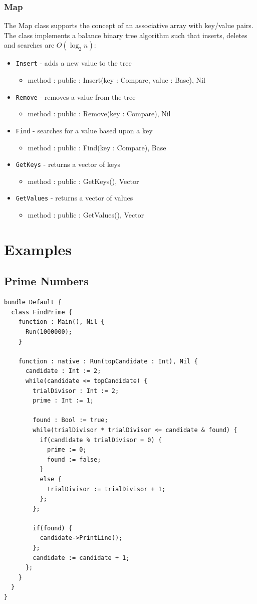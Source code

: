 \documentclass[12pt]{article}
\begin{document}
\subsubsection{Map}
The Map class supports the concept of an associative array with key/value pairs.  The class implements a balance binary tree algorithm such that inserts, deletes and searches are $O(\log_2 n)$:
\begin{itemize}
    \item \texttt{Insert} - adds a new value to the tree
    	\begin{itemize}
	\item method : public : Insert(key : Compare, value : Base), Nil
	\end{itemize}
    \item \texttt{Remove} - removes a value from the tree
    	\begin{itemize}
	\item method : public : Remove(key : Compare), Nil
	\end{itemize}
    \item \texttt{Find} - searches for a value based upon a key
    	\begin{itemize}
	\item method : public : Find(key : Compare), Base
	\end{itemize}
    \item \texttt{GetKeys} - returns a vector of keys
    	\begin{itemize}
	\item method : public : GetKeys(), Vector
	\end{itemize}
    \item \texttt{GetValues} - returns a vector of values
    	\begin{itemize}
	\item method : public : GetValues(), Vector
	\end{itemize}
\end{itemize}

\section{Examples}
\subsection{Prime Numbers}
\begin{verbatim}
bundle Default {
  class FindPrime {
    function : Main(), Nil {
      Run(1000000);
    }

    function : native : Run(topCandidate : Int), Nil {
      candidate : Int := 2;
      while(candidate <= topCandidate) {
        trialDivisor : Int := 2;
        prime : Int := 1;

        found : Bool := true;
        while(trialDivisor * trialDivisor <= candidate & found) {
          if(candidate % trialDivisor = 0) {
            prime := 0;
            found := false;
          }
          else {
            trialDivisor := trialDivisor + 1;
          };
        };

        if(found) {
          candidate->PrintLine();
        };
        candidate := candidate + 1;
      };
    }
  }
}
\end{verbatim}
\end{document}
